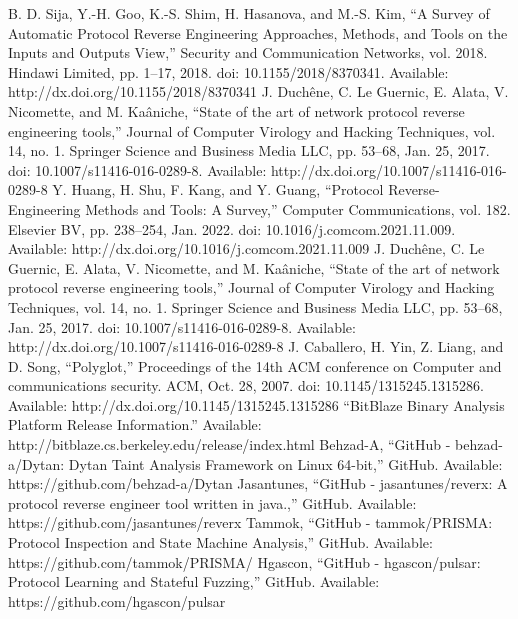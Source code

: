\documentclass[conference]{IEEEtran}
\begin{document}
\begin{thebibliography}{00}
     B. D. Sija, Y.-H. Goo, K.-S. Shim, H. Hasanova, and M.-S. Kim, “A Survey of Automatic Protocol Reverse Engineering Approaches, Methods, and Tools on the Inputs and Outputs View,” Security and Communication Networks, vol. 2018. Hindawi Limited, pp. 1–17, 2018. doi: 10.1155/2018/8370341. Available: http://dx.doi.org/10.1155/2018/8370341 
     J. Duchêne, C. Le Guernic, E. Alata, V. Nicomette, and M. Kaâniche, “State of the art of network protocol reverse engineering tools,” Journal of Computer Virology and Hacking Techniques, vol. 14, no. 1. Springer Science and Business Media LLC, pp. 53–68, Jan. 25, 2017. doi: 10.1007/s11416-016-0289-8. Available: http://dx.doi.org/10.1007/s11416-016-0289-8 
     Y. Huang, H. Shu, F. Kang, and Y. Guang, “Protocol Reverse-Engineering Methods and Tools: A Survey,” Computer Communications, vol. 182. Elsevier BV, pp. 238–254, Jan. 2022. doi: 10.1016/j.comcom.2021.11.009. Available: http://dx.doi.org/10.1016/j.comcom.2021.11.009 
     J. Duchêne, C. Le Guernic, E. Alata, V. Nicomette, and M. Kaâniche, “State of the art of network protocol reverse engineering tools,” Journal of Computer Virology and Hacking Techniques, vol. 14, no. 1. Springer Science and Business Media LLC, pp. 53–68, Jan. 25, 2017. doi: 10.1007/s11416-016-0289-8. Available: http://dx.doi.org/10.1007/s11416-016-0289-8 
     J. Caballero, H. Yin, Z. Liang, and D. Song, “Polyglot,” Proceedings of the 14th ACM conference on Computer and communications security. ACM, Oct. 28, 2007. doi: 10.1145/1315245.1315286. Available: http://dx.doi.org/10.1145/1315245.1315286 
     “BitBlaze Binary Analysis Platform Release Information.” Available: http://bitblaze.cs.berkeley.edu/release/index.html
     Behzad-A, “GitHub - behzad-a/Dytan: Dytan Taint Analysis Framework on Linux 64-bit,” GitHub. Available: https://github.com/behzad-a/Dytan
     Jasantunes, “GitHub - jasantunes/reverx: A protocol reverse engineer tool written in java.,” GitHub. Available: https://github.com/jasantunes/reverx
     Tammok, “GitHub - tammok/PRISMA: Protocol Inspection and State Machine Analysis,” GitHub. Available: https://github.com/tammok/PRISMA/
     Hgascon, “GitHub - hgascon/pulsar: Protocol Learning and Stateful Fuzzing,” GitHub. Available: https://github.com/hgascon/pulsar

\end{thebibliography}
\end{document}
